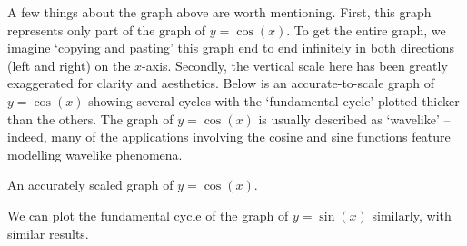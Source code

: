 A few things about the graph above are worth mentioning. First, this graph represents only part of the graph of $y = \cos(x)$.  To get the entire graph, we imagine `copying and pasting' this graph end to end infinitely in both directions (left and right) on the $x$-axis.  Secondly, the vertical scale here has been greatly exaggerated for clarity and aesthetics. Below is an accurate-to-scale graph of $y = \cos(x)$ showing several cycles with the `fundamental cycle' plotted thicker than the others.    The graph of $y=\cos(x)$ is usually described as `wavelike' -- indeed, many of the applications involving the cosine and sine functions feature modelling wavelike phenomena.   

\medskip

\noindent\begin{minipage}{\textwidth}
\begin{center}
\end{center} 
\captionsetup{type=figure}
\caption{An accurately scaled graph of $y = \cos(x)$.}
\end{minipage}

\medskip

We can plot the fundamental cycle of the graph of $y = \sin(x)$ similarly, with similar results.  

